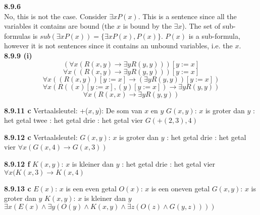 \noindent \textbf{8.9.6} \\ No, this is not the case. Consider $\exists x P(x)$. This is a sentence since all the variables it contains are bound (the $x$ is bound by the $\exists x$). The set of sub-formulas is $sub(\exists x P(x)) = \{\exists x P(x), P(x)\}$. $P(x)$ is a sub-formula, however it is not sentences since it contains an unbound variables, i.e. the $x$.\\
\newline
\noindent \textbf{8.9.9 (i)} \\
$$(\forall x(R(x,y) \rightarrow \exists y R(y,y)))[y := x]$$
$$\forall x((R(x,y) \rightarrow \exists y R(y,y)))[y := x]$$ 
$$\forall x((R(x,y))[y := x] \rightarrow (\exists y R(y,y))[y := x])$$
$$\forall x(R((x)[y := x],(y)[y := x]) \rightarrow \exists y R(y,y))$$
$$\forall x(R(x,x) \rightarrow \exists y R(y,y))$$

\vspace{2mm}
\noindent \textbf{8.9.11 c}
\newline
Vertaalsleutel: \newline
+($x,y$): De som van $x$ en $y$\newline
$G(x,y)$: $x$ is groter dan $y$ : het getal twee : het getal drie : het getal vier \newline
$G(+(2,3),4)$ \newline

\vspace{2mm}
\noindent \textbf{8.9.12 c}
\newline
Vertaalsleutel: \newline
$G(x,y)$: $x$ is groter dan $y$ : het getal drie : het getal vier \newline
$\forall x (G(x,4) \rightarrow G(x,3))$ \newline

\vspace{2mm}
\noindent \textbf{8.9.12 f}
\newline
$K(x,y)$: $x$ is kleiner dan $y$ : het getal drie : het getal vier \newline
$\forall x (K(x,3)\rightarrow K(x,4)$

\vspace{2mm}
\noindent \textbf{8.9.13 c}
\newline
$E(x)$: $x$ is een even getal \newline
$O(x)$: $x$ is een oneven getal \newline
$G(x,y)$: $x$ is groter dan $y$ \newline
$K(x,y)$: $x$ is kleiner dan $y$ \newline
$\exists x (E(x) \land \exists y (O(y) \land K(x,y) \land \exists z (O(z) \land G(y,z))))$ \newline


